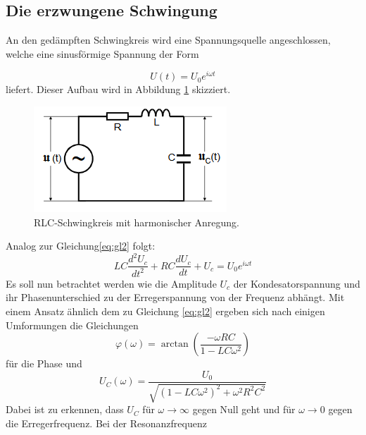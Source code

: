 \subsection{Die erzwungene Schwingung}
An den gedämpften Schwingkreis wird eine Spannungsquelle angeschlossen, welche eine sinusförmige Spannung der Form

\begin{equation*}
  U(t)= U_0 e^{i\omega t}
\end{equation*}
liefert.
Dieser Aufbau wird in Abbildung \ref{fig:erzw} skizziert.
\begin{figure}[H]
    \centering
    \caption{RLC-Schwingkreis mit harmonischer Anregung.\cite{v354}}
    \label{fig:erzw}
    \includegraphics[width=\textwidth-20em]{content/erzwungen.png}
\end{figure}
\noindent
Analog zur Gleichung\eqref{eq:gl2} folgt:
\begin{equation}
  LC\frac{d^2 U_c}{dt^2} +RC \frac{d U_c}{dt}+U_c = U_0 e^{i\omega t}
\end{equation}
Es soll nun betrachtet werden wie die Amplitude $U_c$ der Kondesatorspannung und ihr Phasenunterschied zu der Erregerspannung von der Frequenz abhängt.
Mit einem Ansatz ähnlich dem zu Gleichung \eqref{eq:gl2} ergeben sich nach einigen Umformungen die Gleichungen
\begin{equation}
  \varphi(\omega)=\arctan\left(\frac{-\omega RC}{1-LC\omega^2}\right)
\end{equation}
für die Phase und
\begin{equation}
  \label{eq:gl7}
  U_C(\omega)=\frac{U_0}{\sqrt{(1-LC\omega^2)^2+\omega^2 R^2 C^2}}
\end{equation}
Dabei ist zu erkennen, dass $U_C$ für $\omega \rightarrow \infty$ gegen Null geht und für $\omega \rightarrow 0$ gegen die Erregerfrequenz.
Bei der Resonanzfrequenz
